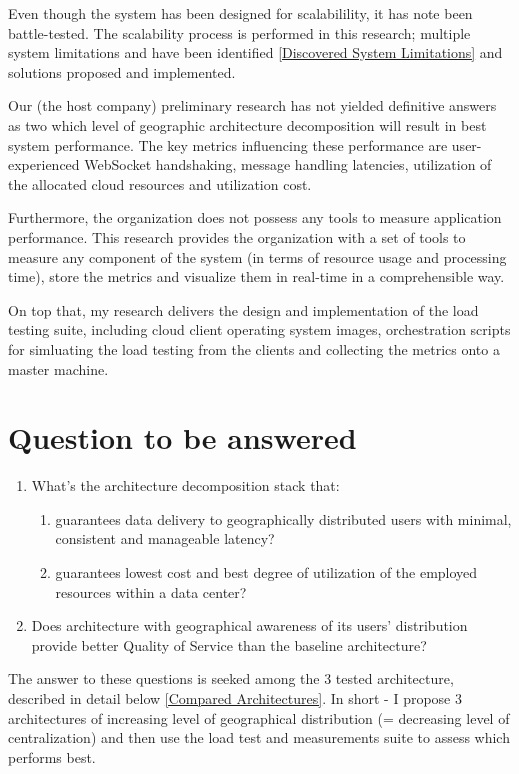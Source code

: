 \documentclass{uvamscse}
\begin{document}
Even though the system has been designed for scalabilility, it has note been battle-tested. The scalability process is performed in this research; multiple system limitations and have been identified \ref{Discovered System Limitations} and solutions proposed and implemented.

Our (the host company) preliminary research has not yielded definitive answers as two which level of geographic architecture decomposition will result in best system performance. The key metrics influencing these performance are user-experienced WebSocket handshaking, message handling latencies, utilization of the allocated cloud resources and utilization cost.

Furthermore, the organization does not possess any tools to measure application performance. This research provides the organization with a set of tools to measure any component of the system (in terms of resource usage and processing time), store the metrics and visualize them in real-time in a comprehensible way.

On top that, my research delivers the design and implementation of the load testing suite, including cloud client operating system images, orchestration scripts for simluating the load testing from the clients and collecting the metrics onto a master machine.

\section{Question to be answered}
\begin{enumerate}
  \item What's the architecture decomposition stack that:
    \begin{enumerate}
      \item guarantees data delivery to geographically distributed users with minimal, consistent and manageable latency?
      \item guarantees lowest cost and best degree of utilization of the employed resources within a data center?
    \end{enumerate}
  \item Does architecture with geographical awareness of its users' distribution provide better Quality of Service than the baseline architecture?
\end{enumerate}

The answer to these questions is seeked among the 3 tested architecture, described in detail below \ref{Compared Architectures}. In short - I propose 3 architectures of increasing level of geographical distribution (= decreasing level of centralization) and then use the load test and measurements suite to assess which performs best.
\end{document}

